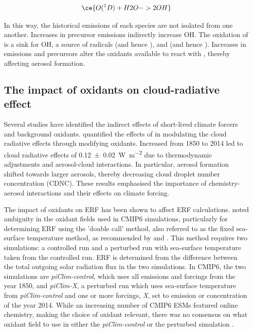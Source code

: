 \begin{equation}
    \ce{O(^1D) + H2O -> 2OH}
\end{equation}

In this way, the historical emissions of each species are not isolated from one another. Increases in  precursor emissions indirectly increase OH. The oxidation of  is a sink for OH, a source of  radicals (and hence ), and  (and hence ). Increases in  emissions and  precursors alter the oxidants available to react with , thereby affecting aerosol formation.


\subsection{The impact of oxidants on cloud-radiative effect}

Several studies have identified the indirect effects of short-lived climate forcers and background oxidants. \citet{oconnorApportionmentPreIndustrial2022} quantified the effects of  in modulating the cloud radiative effects through modifying oxidants. Increased  from 1850 to 2014 led to cloud radiative effects of \qty{0.12+-0.02}{\watt\per\metre\squared} due to thermodynamic adjustments and aerosol-cloud interactions. In particular, aerosol formation shifted towards larger aerosols, thereby decreasing cloud droplet number concentration (CDNC). These results emphasised the importance of chemistry-aerosol interactions and their effects on climate forcing. 

The impact of oxidants on ERF has been shown to affect ERF calculations. \citet{karsetStrongImpactsAerosol2018} noted ambiguity in the oxidant fields used in CMIP6 simulations, particularly for determining ERF using the 'double call' method, also referred to as the fixed sea-surface temperature method, as recommended by \citet{ghanMinimalRepresentationAerosols2012} and \citet{forsterRecommendationsDiagnosingEffective2016}. This method requires two simulations: a controlled run and a perturbed run with sea-surface temperature taken from the controlled run. ERF is determined from the difference between the total outgoing solar radiation flux in the two simulations. In CMIP6, the two simulations are \textit{piClim-control}, which uses all emissions and forcings from the year 1850, and \textit{piClim-X}, a perturbed run which uses sea-surface temperature from \textit{piClim-control} and one or more forcings, \textit{X}, set to emission or concentration of the year 2014. While an increasing number of CMIP6 ESMs featured online chemistry, making the choice of oxidant relevant, there was no consensus on what oxidant field to use in either the \textit{piClim-control} or the perturbed simulation \citep{karsetStrongImpactsAerosol2018}. 

